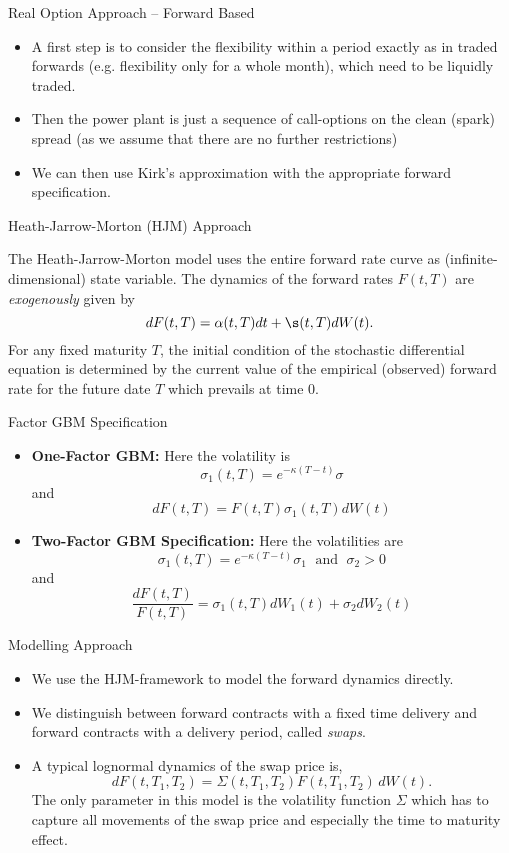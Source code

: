 {Real Option Approach -- Forward Based}
\begin{itemize}
\item<1-> A first step is to consider the flexibility within a period exactly as in traded forwards (e.g. flexibility only for a whole month), which need to be liquidly traded.
\item<2-> Then the power plant is just a sequence of call-options on the clean (spark) spread
(as we assume that there are no further restrictions)
\item<3-> We can then use Kirk's approximation with the appropriate forward specification.
\end{itemize}





{Heath-Jarrow-Morton (HJM) Approach}

The Heath-Jarrow-Morton model uses the entire forward rate curve as
(infinite-dimensional) state variable. The dynamics of the forward rates $F(t,T)$ are {\it exogenously} given by
$$
dF(t,T) = \alpha(t,T) dt + \s(t,T) dW(t).
$$
For any fixed maturity $T$, the
initial condition of the stochastic differential equation
is determined by the current value
of the empirical (observed) forward rate for the future date $T$
which prevails at time $0$.






{Factor GBM Specification}
\begin{itemize}
\item<1-> {\bf One-Factor GBM:} Here the volatility is
$$
\sigma_1(t,T)=e^{-\kappa (T-t)}\sigma
$$
and
$$
dF(t,T)=F(t,T)\sigma_1(t,T)dW(t)
$$
\item<2->{\bf Two-Factor GBM Specification:}
Here the volatilities are
$$
\sigma_1(t,T)=e^{-\kappa (T-t)}\sigma_1 \; \mbox{ and } \; \sigma_2>0
$$
and
$$
\frac{dF(t,T)}{F(t,T)}=\sigma_1(t,T)dW_1(t)+\sigma_2dW_2(t)
$$
\end{itemize}



{Modelling Approach}
\begin{itemize}
\item<1-> We use the HJM-framework to model the forward dynamics directly.
\item<2-> We distinguish between forward contracts with a fixed time delivery and forward contracts with a delivery period, called \emph{swaps}.
\item<3-> A typical lognormal dynamics of the swap price is,
\begin{equation}
dF(t,T_1,T_2)=\Sigma(t,T_1,T_2)F(t,T_1,T_2)\, dW(t). \label{eqn: lognormal dynamics}
\end{equation}
The only parameter in this model is the volatility function $\Sigma$ which has to capture all movements of the swap price and especially the time to maturity effect.

\end{itemize}





